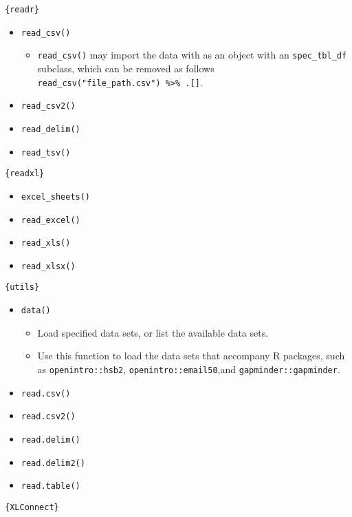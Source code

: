 \documentclass[
]{book}
\providecommand{\tightlist}{%
  \setlength{\itemsep}{0pt}\setlength{\parskip}{0pt}}
\begin{document}
\texttt{\{readr\}}

\begin{itemize}
\tightlist
\item
  \texttt{read\_csv()}

  \begin{itemize}
  \tightlist
  \item
    \texttt{read\_csv()} may import the data with as an object with an \texttt{spec\_tbl\_df} subclass, which can be removed as follows \texttt{read\_csv("file\_path.csv")\ \%\textgreater{}\%\ .{[}{]}}.
  \end{itemize}
\item
  \texttt{read\_csv2()}
\item
  \texttt{read\_delim()}
\item
  \texttt{read\_tsv()}
\end{itemize}

\texttt{\{readxl\}}

\begin{itemize}
\tightlist
\item
  \texttt{excel\_sheets()}
\item
  \texttt{read\_excel()}
\item
  \texttt{read\_xls()}
\item
  \texttt{read\_xlsx()}
\end{itemize}

\texttt{\{utils\}}

\begin{itemize}
\tightlist
\item
  \texttt{data()}

  \begin{itemize}
  \tightlist
  \item
    Load specified data sets, or list the available data sets.
  \item
    Use this function to load the data sets that accompany R packages, such as \texttt{openintro::hsb2}, \texttt{openintro::email50},and \texttt{gapminder::gapminder}.
  \end{itemize}
\item
  \texttt{read.csv()}
\item
  \texttt{read.csv2()}
\item
  \texttt{read.delim()}
\item
  \texttt{read.delim2()}
\item
  \texttt{read.table()}
\end{itemize}

\texttt{\{XLConnect\}}
\end{document}

